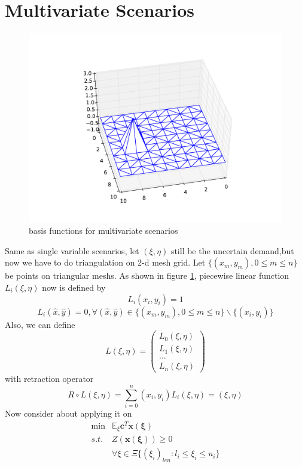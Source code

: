 \documentclass{article}
\begin{document}
\section{Multivariate Scenarios}
\begin{figure}
\centering
\includegraphics[width=\textwidth]{basis_3.pdf}
\caption{basis functions for multivariate scenarios}\label{multi}
\end{figure}
Same as single variable scenarios, let $(\xi,\eta)$ still be the uncertain demand,but now we have to do triangulation on 2-d mesh grid. Let $\{(x_m,y_m),0 \leq m \leq n\} $ be points on triangular meshs. As shown in figure \ref{multi}, piecewise linear function $L_i(\xi,\eta)$ now is defined by
$$
L_i(x_i,y_i) = 1
$$
$$
L_i(\hat{x},\hat{y}) = 0 ,\forall (\hat{x},\hat{y}) \in \{(x_m,y_m),0 \leq m \leq n\}\backslash \{(x_i,y_i)\}
$$
Also, we can define
$$
L(\xi,\eta) =
\left(
\begin{array}{c}
L_0(\xi,\eta)\\
L_1(\xi,\eta)\\
\ldots\\
L_n(\xi,\eta)
\end{array}
\right)
$$
with retraction operator 
$$
R\circ L(\xi,\eta) = \sum\limits_{i=0}^{n} (x_i,y_i) L_i(\xi,\eta) = (\xi,\eta)
$$
Now consider about applying it on
$$
\begin{array}{ll}
\min & \mathbb{E_\xi}\mathbf{c}^T \mathbf{x(\xi)}\\
s.t. & Z(\mathbf{x(\xi)}) \geq 0 \\
& \forall \xi \in \Xi \{(\xi_i)_{len}:l_i \leq \xi_i \leq u_i \}
\end{array}
$$
\end{document}
